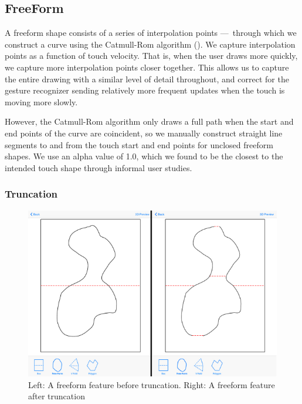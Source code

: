 \subsection{FreeForm}\label{freeform}

A freeform shape consists of a series of interpolation points
---~through which we construct a curve using the Catmull-Rom algorithm
(\citet{catmull1974class}). We capture interpolation points as a
function of touch velocity. That is, when the user draws more quickly,
we capture more interpolation points closer together. This allows us to
capture the entire drawing with a similar level of detail throughout,
and correct for the gesture recognizer sending relatively more frequent
updates when the touch is moving more slowly.

However, the Catmull-Rom algorithm only draws a full path when the start
and end points of the curve are coincident, so we manually construct
straight line segments to and from the touch start and end points for
unclosed freeform shapes. We use an alpha value of 1.0, which we found
to be the closest to the intended touch shape through informal user
studies.

\subsubsection{Truncation}\label{truncation}

\begin{figure}[htbp]
\centering
\includegraphics{figures/41_Tech_Tool_Implementation/truncationBeforeAfter.pdf}
\caption{Left: A freeform feature before truncation. Right: A freeform
feature after truncation}
\end{figure}


